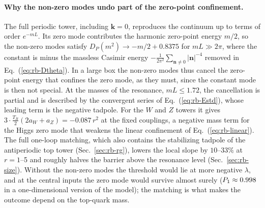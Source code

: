 \paragraph{Why the non-zero modes undo part of the zero-point confinement.}
The full periodic tower, including $\bm k=0$, reproduces the continuum up to terms of order $e^{-mL}$.
Its zero mode contributes the harmonic zero-point energy $m/2$, so the non-zero modes satisfy $D_P(m^2)\to-m/2+0.8375$ for $mL\gg2\pi$, where the constant is minus the massless Casimir energy $-\frac{1}{2\pi^2}\sum_{\bm n\neq0}|\bm n|^{-4}$ removed in Eq.~(\ref{eq:rb-Dtheta}). %
In a large box the non-zero modes thus cancel the zero-point energy that confines the zero mode, as they must, since the constant mode is then not special.
At the masses of the resonance, $mL\le1.72$, the cancellation is partial and is described by the convergent series of Eq.~(\ref{eq:rb-Estd}), whose leading term is the negative tadpole. %
For the $W$ and $Z$ towers it gives $3\cdot\frac{T_B}{2}(2a_W+a_Z)=-0.087\,r^2$ at the fixed couplings, a negative mass term for the Higgs zero mode that weakens the linear confinement of Eq.~(\ref{eq:rb-linear}). %
The full one-loop matching, which also contains the stabilizing tadpole of the antiperiodic top tower (Sec.~\ref{sec:rb-rg}), lowers the local slope by $10$--$33\%$ at $r=1$--5 and roughly halves the barrier above the resonance level (Sec.~\ref{sec:rb-size}). %
Without the non-zero modes the threshold would lie at more negative $\lambda$, and at the central inputs the zero mode would survive almost surely ($P_1\approx0.998$ in a one-dimensional version of the model); the matching is what makes the outcome depend on the top-quark mass. %


